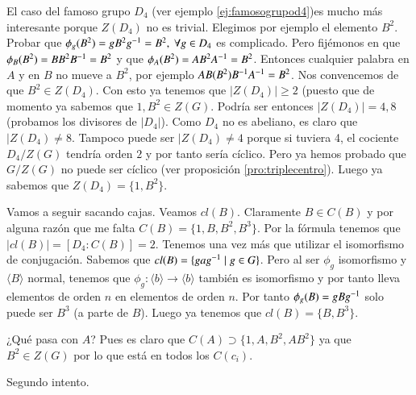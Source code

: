 \begin{ej}
	\label{ej:clasesd4}
	El caso del famoso grupo $D_4$ (ver ejemplo \ref{ej:famosogrupod4})es mucho más interesante porque $Z(D_4)$ no es trivial. Elegimos por ejemplo el elemento $B^2$. Probar que $\phi_g(B^2) = gB^2\inv{g} = B^2,\ \forall g \in D_4$ es complicado. Pero fijémonos en que $\phi_B(B^2) = BB^2B^{-1} = B^2$ y que $\phi_A(B^2) = AB^2A^{-1} = B^2$. Entonces cualquier palabra en $A$ y en $B$ no mueve a $B^2$, por ejemplo $AB(B^2)B^{-1}A^{-1} = B^2$. Nos convencemos de que $B^2 \in Z(D_4)$. Con esto ya tenemos que $|Z(D_4)| \geq 2$ (puesto que de momento ya sabemos que $1, B^2 \in Z(G)$. Podría ser entonces $|Z(D_4)| = 4, 8$ (probamos los divisores de $|D_4|$). Como $D_4$ no es abeliano, es claro que $|Z(D_4) \neq 8$. Tampoco puede ser $|Z(D_4) \neq 4$ porque si tuviera 4, el cociente $D_4/Z(G)$ tendría orden $2$ y por tanto sería cíclico. Pero ya hemos probado que $G/Z(G)$ no puede ser cíclico (ver proposición \ref{pro:triplecentro}). Luego ya sabemos que $Z(D_4) = \{1, B^2\}$.
	
	Vamos a seguir sacando cajas. Veamos $cl(B)$. Claramente $B \in C(B)$ y por alguna razón que me falta $C(B) = \{1, B, B^2, B^3\}$. Por la fórmula tenemos que $|cl(B)| = [D_4:C(B)] = 2$. Tenemos una vez más que utilizar el isomorfismo de conjugación. Sabemos que $cl(B) = \{gag^{-1} \mid g \in G\}$. Pero al ser $\phi_g$ isomorfismo y $\langle B \rangle$ normal, tenemos que $\phi_g : \langle b \rangle \to \langle b \rangle$ también es isomorfismo y por tanto lleva elementos de orden $n$ en elementos de orden $n$. Por tanto $\phi_g(B) = gBg^{-1}$ solo puede ser $B^3$ (a parte de $B$). Luego ya tenemos que $cl(B) = \{B, B^3\}$.
	
	¿Qué pasa con $A$? Pues es claro que $C(A) \supset \{1, A, B^2, AB^2\}$ ya que $B^2 \in Z(G)$ por lo que está en todos los $C(c_i)$.
	
	
	Segundo intento.
	

\end{ej}
